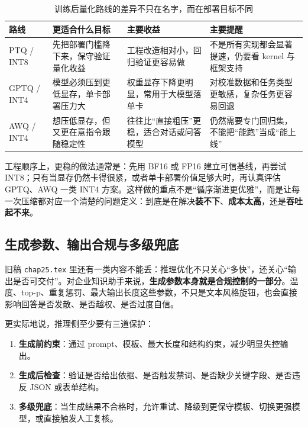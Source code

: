 \begin{table}[H]
\centering
\small
\begin{tabularx}{\textwidth}{>{\raggedright\arraybackslash}p{2.4cm}>{\raggedright\arraybackslash}p{3cm}>{\raggedright\arraybackslash}p{2.7cm}>{\raggedright\arraybackslash}X}
\toprule
\textbf{路线} & \textbf{更适合什么目标} & \textbf{主要收益} & \textbf{主要提醒} \\
\midrule
PTQ / INT8 & 先把部署门槛降下来，保守验证量化收益 & 工程改造相对小，回归验证更容易做 & 不是所有实现都会显著提速，仍要看 kernel 与框架支持 \\
GPTQ / INT4 & 模型必须压到更低显存，单卡部署压力大 & 权重显存下降更明显，常用于大模型落单卡 & 对校准数据和任务类型更敏感，复杂任务更容易回退 \\
AWQ / INT4 & 想压低显存，但又更在意指令跟随稳定性 & 往往比“直接粗压”更稳，适合对话或问答模型 & 仍然需要专门回归集，不能把“能跑”当成“能上线” \\
\bottomrule
\end{tabularx}
\caption{训练后量化路线的差异不只在名字，而在部署目标不同}
\label{tab:post-training-quantization-routes}
\end{table}

工程顺序上，更稳的做法通常是：先用 BF16 或 FP16 建立可信基线，再尝试 INT8；只有当显存仍然卡得很紧，或者单卡部署价值足够大时，再认真评估 GPTQ、AWQ 一类 INT4 方案。这样做的重点不是“循序渐进更优雅”，而是让每一次压缩都对应一个清楚的问题定义：到底是在解决\textbf{装不下}、\textbf{成本太高}，还是\textbf{吞吐起不来}。

\subsection{生成参数、输出合规与多级兜底}
旧稿 \texttt{chap25.tex} 里还有一类内容不能丢：推理优化不只关心“多快”，还关心“输出是否可交付”。对企业知识助手来说，\textbf{生成参数本身就是合规控制的一部分}。温度、top-p、重复惩罚、最大输出长度这些参数，不只是文本风格旋钮，也会直接影响回答是否发散、是否越权、是否过度自信。

更实际地说，推理侧至少要有三道保护：
\begin{enumerate}
  \item \textbf{生成前约束}：通过 prompt、模板、最大长度和结构约束，减少明显失控输出。
  \item \textbf{生成后检查}：验证是否给出依据、是否触发禁词、是否缺少关键字段、是否违反 JSON 或表单结构。
  \item \textbf{多级兜底}：当生成结果不合格时，允许重试、降级到更保守模板、切换更强模型，或直接触发人工复核。
\end{enumerate}

